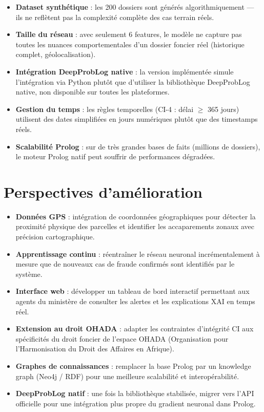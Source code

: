 \documentclass[11pt,a4paper]{report}
\begin{document}
\begin{itemize}[leftmargin=*]
  \item \textbf{Dataset synthétique} : les 200 dossiers sont générés
    algorithmiquement --- ils ne reflètent pas la complexité complète des cas
    terrain réels.
  \item \textbf{Taille du réseau} : avec seulement 6 features, le modèle ne
    capture pas toutes les nuances comportementales d'un dossier foncier réel
    (historique complet, géolocalisation).
  \item \textbf{Intégration DeepProbLog native} : la version implémentée simule
    l'intégration via Python plutôt que d'utiliser la bibliothèque DeepProbLog
    native, non disponible sur toutes les plateformes.
  \item \textbf{Gestion du temps} : les règles temporelles (CI-4 : délai
    $\geq$ 365 jours) utilisent des dates simplifiées en jours numériques plutôt
    que des timestamps réels.
  \item \textbf{Scalabilité Prolog} : sur de très grandes bases de faits
    (millions de dossiers), le moteur Prolog natif peut souffrir de performances
    dégradées.
\end{itemize}

\section{Perspectives d'amélioration}

\begin{itemize}[leftmargin=*]
  \item \textbf{Données GPS} : intégration de coordonnées géographiques pour
    détecter la proximité physique des parcelles et identifier les accaparements
    zonaux avec précision cartographique.
  \item \textbf{Apprentissage continu} : réentraîner le réseau neuronal
    incrémentalement à mesure que de nouveaux cas de fraude confirmés sont
    identifiés par le système.
  \item \textbf{Interface web} : développer un tableau de bord interactif
    permettant aux agents du ministère de consulter les alertes et les
    explications XAI en temps réel.
  \item \textbf{Extension au droit OHADA} : adapter les contraintes d'intégrité
    CI aux spécificités du droit foncier de l'espace OHADA (Organisation pour
    l'Harmonisation du Droit des Affaires en Afrique).
  \item \textbf{Graphes de connaissances} : remplacer la base Prolog par un
    knowledge graph (Neo4j / RDF) pour une meilleure scalabilité et
    interopérabilité.
  \item \textbf{DeepProbLog natif} : une fois la bibliothèque stabilisée,
    migrer vers l'API officielle pour une intégration plus propre du gradient
    neuronal dans Prolog.
\end{itemize}
\end{document}
